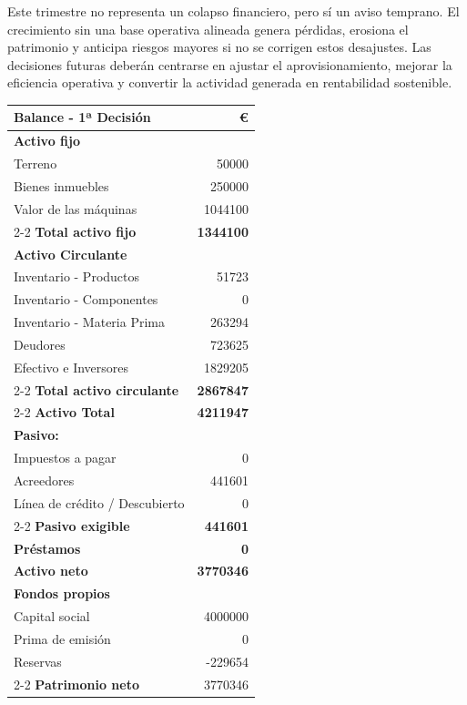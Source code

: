 Este trimestre no representa un colapso financiero, pero sí un aviso temprano. El crecimiento sin una base operativa alineada genera pérdidas, erosiona el patrimonio y anticipa riesgos mayores si no se corrigen estos desajustes. Las decisiones futuras deberán centrarse en ajustar el aprovisionamiento, mejorar la eficiencia operativa y convertir la actividad generada en rentabilidad sostenible.


\begin{table}[h]
    \centering
    \begin{tabular}{lr}
        \textbf{Balance - 1ª Decisión}               & \textbf{€} \\
        \hline
        \textbf{Activo fijo}                & \\
        Terreno                             & 50000 \\
        Bienes inmuebles                    & 250000 \\
        Valor de las máquinas               & 1044100 \\
        \cline{2-2}
        \textbf{Total activo fijo}          & \textbf{1344100} \\
        \textbf{Activo Circulante}          & \\
        Inventario - Productos              & 51723 \\
        Inventario - Componentes            & 0 \\
        Inventario - Materia Prima          & 263294 \\
        Deudores                            & 723625 \\
        Efectivo e Inversores               & 1829205 \\
        \cline{2-2}
        \textbf{Total activo circulante}    & \textbf{2867847} \\
        \cline{2-2}
        \textbf{Activo Total}               & \textbf{4211947} \\
        \textbf{Pasivo:}                    & \\
        Impuestos a pagar                   & 0 \\
        Acreedores                          & 441601 \\
        Línea de crédito / Descubierto      & 0 \\
        \cline{2-2}
        \textbf{Pasivo exigible}            & \textbf{441601} \\
        \textbf{Préstamos}                  & \textbf{0} \\
        \textbf{Activo neto}                & \textbf{3770346} \\
        \textbf{Fondos propios}             & \\
        Capital social                      & 4000000 \\
        Prima de emisión                    & 0 \\
        Reservas                            & -229654 \\
        \cline{2-2}
        \textbf{Patrimonio neto}            & 3770346 
    \end{tabular}
\end{table}

